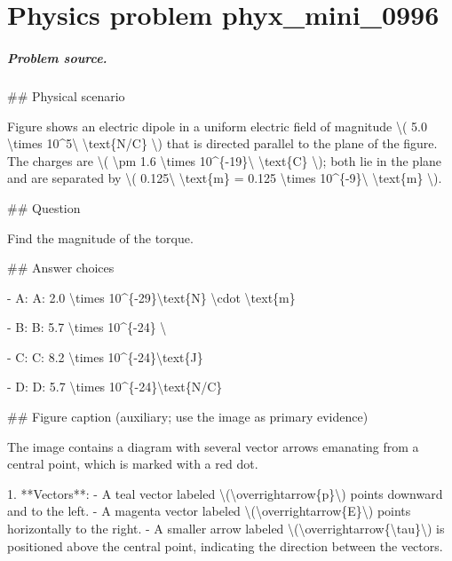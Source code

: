 
\chapter{Physics problem phyx\_mini\_0996}
\label{ch:PhyXMiniProblems_problem_phyx_mini_0996}

\paragraph{Problem source.}
\#\# Physical scenario

Figure shows an electric dipole in a uniform electric field of magnitude \textbackslash{}( 5.0 \textbackslash{}times 10\textasciicircum{}5\textbackslash{} \textbackslash{}text\{N/C\} \textbackslash{}) that is directed parallel to the plane of the figure. The charges are \textbackslash{}( \textbackslash{}pm 1.6 \textbackslash{}times 10\textasciicircum{}\{-19\}\textbackslash{} \textbackslash{}text\{C\} \textbackslash{}); both lie in the plane and are separated by \textbackslash{}( 0.125\textbackslash{} \textbackslash{}text\{m\} = 0.125 \textbackslash{}times 10\textasciicircum{}\{-9\}\textbackslash{} \textbackslash{}text\{m\} \textbackslash{}).

\#\# Question

Find the magnitude of the torque.

\#\# Answer choices

- A: A: 2.0 \textbackslash{}times 10\textasciicircum{}\{-29\}\textbackslash{}text\{N\} \textbackslash{}cdot \textbackslash{}text\{m\}

- B: B: 5.7 \textbackslash{}times 10\textasciicircum{}\{-24\} \textbackslash{}

- C: C: 8.2 \textbackslash{}times 10\textasciicircum{}\{-24\}\textbackslash{}text\{J\}

- D: D: 5.7 \textbackslash{}times 10\textasciicircum{}\{-24\}\textbackslash{}text\{N/C\}

\#\# Figure caption (auxiliary; use the image as primary evidence)

The image contains a diagram with several vector arrows emanating from a central point, which is marked with a red dot. 

1. **Vectors**:
   - A teal vector labeled \textbackslash{}(\textbackslash{}overrightarrow\{p\}\textbackslash{}) points downward and to the left.
   - A magenta vector labeled \textbackslash{}(\textbackslash{}overrightarrow\{E\}\textbackslash{}) points horizontally to the right.
   - A smaller arrow labeled \textbackslash{}(\textbackslash{}overrightarrow\{\textbackslash{}tau\}\textbackslash{}) is positioned above the central point, indicating the direction between the vectors.

